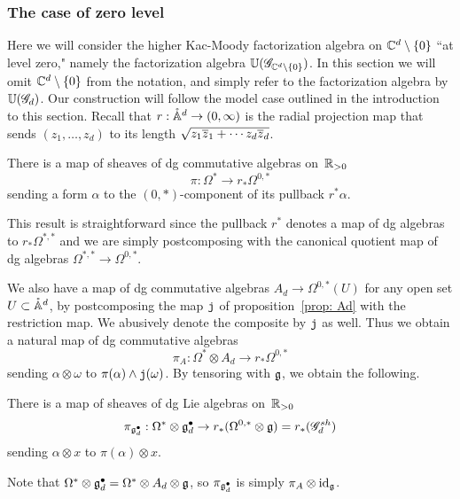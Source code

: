 \subsubsection{The case of zero level}

Here we will consider the higher Kac-Moody factorization algebra on $\mathbb C^d \setminus \{0\}$ ``at level zero," namely the factorization algebra $\mathbb U(\mathscr G_{\mathbb C^d \setminus\{0\}})$.
In this section we will omit $\mathbb C^d \setminus \{0\}$ from the notation, and simply refer to the factorization algebra by $\mathbb U(\mathscr G_d)$. 
Our construction will follow the model case outlined in the introduction to this section.
Recall that $r: \mathring{\mathbb A}^d \to (0,\infty)$ is the radial projection map that sends $(z_1,\ldots,z_d)$ to its length $\sqrt{z_1\overline{z}_1 + \cdots z_d \overline{z}_d}$.

\begin{lem}
There is a map of sheaves of dg commutative algebras on~$\mathbb R_{>0}$
\[
\pi: \Omega^* \to r_* \Omega^{0,*}
\]
sending a form $\alpha$ to the $(0,*)$-component of its pullback $r^*\alpha$.
\end{lem}

This result is straightforward since the pullback $r^*$ denotes a map of dg algebras to $r_* \Omega^{*,*}$ and we are simply postcomposing with the canonical quotient map of dg algebras $\Omega^{*,*} \to \Omega^{0,*}$. 

We also have a map of dg commutative algebras $A_d \to \Omega^{0,*}(U)$ for any open set $U \subset \mathring{\mathbb A}^d$,
by postcomposing the map ${\mathtt{j}}$ of proposition~\ref{prop: Ad} with the restriction map.
We abusively denote the composite by ${\mathtt{j}}$ as well.
Thus we obtain a natural map of dg commutative algebras
\[
\pi_A: \Omega^* \otimes A_d \to r_* \Omega^{0,*}
\]
sending $\alpha \otimes \omega$ to $\pi(\alpha) \wedge {\mathtt{j}}(\omega)$.
By tensoring with $\mathfrak g$, we obtain the following.

\begin{cor}
There is a map of sheaves of dg Lie algebras on~$\mathbb R_{>0}$
\[
\pi_{\mathfrak g^\bullet_d}: \Omega^* \otimes \mathfrak g^\bullet_d \to r_* (\Omega^{0,*}\otimes \mathfrak g) = r_*(\mathscr G_d^{sh})
\]
sending $\alpha \otimes x$ to $\pi(\alpha) \otimes x$.
\end{cor}

Note that $\Omega^* \otimes \mathfrak g^\bullet_d = \Omega^* \otimes A_d \otimes \mathfrak g$, so $\pi_{\mathfrak g^\bullet_d}$ is simply $\pi_A \otimes {\rm id}_\mathfrak g$.

